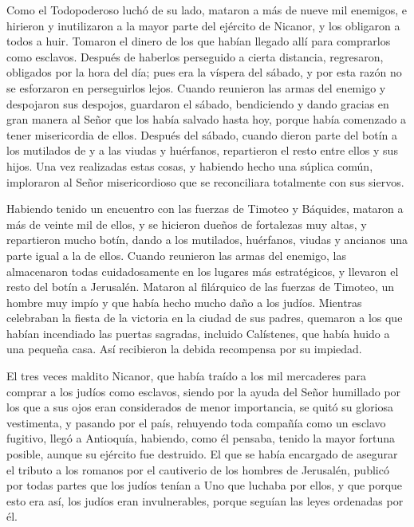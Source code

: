 Como el Todopoderoso luchó de su lado, mataron a más de
nueve mil enemigos, e hirieron y inutilizaron a la mayor parte del
ejército de Nicanor, y los obligaron a todos a huir. 
Tomaron el dinero de los que habían llegado allí para comprarlos como
esclavos. Después de haberlos perseguido a cierta distancia, regresaron,
obligados por la hora del día;  pues era la víspera del
sábado, y por esta razón no se esforzaron en perseguirlos lejos.
 Cuando reunieron las armas del enemigo y despojaron sus
despojos, guardaron el sábado, bendiciendo y dando gracias en gran
manera al Señor que los había salvado hasta hoy, porque había comenzado
a tener misericordia de ellos.  Después del sábado,
cuando dieron parte del botín a los mutilados de y a las viudas y
huérfanos, repartieron el resto entre ellos y sus hijos. 
Una vez realizadas estas cosas, y habiendo hecho una súplica común,
imploraron al Señor misericordioso que se reconciliara totalmente con
sus siervos.

 Habiendo tenido un encuentro con las fuerzas de Timoteo
y Báquides, mataron a más de veinte mil de ellos, y se hicieron dueños
de fortalezas muy altas, y repartieron mucho botín, dando a los
mutilados, huérfanos, viudas y ancianos una parte igual a la de ellos.
 Cuando reunieron las armas del enemigo, las almacenaron
todas cuidadosamente en los lugares más estratégicos, y llevaron el
resto del botín a Jerusalén.  Mataron al filárquico de
las fuerzas de Timoteo, un hombre muy impío y que había hecho mucho daño
a los judíos.  Mientras celebraban la fiesta de la
victoria en la ciudad de sus padres, quemaron a los que habían
incendiado las puertas sagradas, incluido Calístenes, que había huido a
una pequeña casa. Así recibieron la debida recompensa por su impiedad.

 El tres veces maldito Nicanor, que había traído a los
mil mercaderes para comprar a los judíos como esclavos, 
siendo por la ayuda del Señor humillado por los que a sus ojos eran
considerados de menor importancia, se quitó su gloriosa vestimenta, y
pasando por el país, rehuyendo toda compañía como un esclavo fugitivo,
llegó a Antioquía, habiendo, como él pensaba, tenido la mayor fortuna
posible, aunque su ejército fue destruido.  El que se
había encargado de asegurar el tributo a los romanos por el cautiverio
de los hombres de Jerusalén, publicó por todas partes que los judíos
tenían a Uno que luchaba por ellos, y que porque esto era así, los
judíos eran invulnerables, porque seguían las leyes ordenadas por él.

